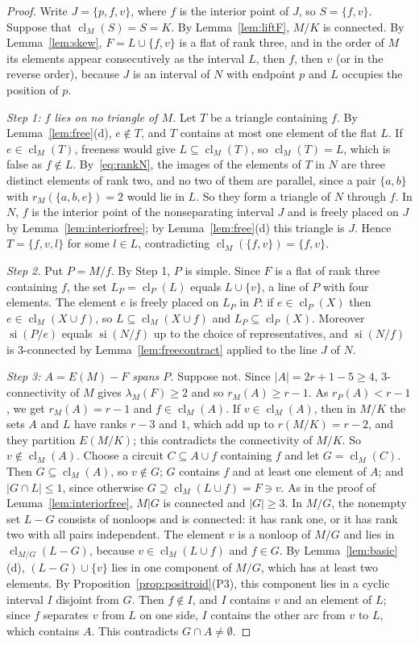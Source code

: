 \documentclass[11pt]{amsart}
\theoremstyle{definition}
\theoremstyle{remark}
\numberwithin{equation}{section}
\newcommand{\cl}{\operatorname{cl}}
\newcommand{\si}{\operatorname{si}}
\newcommand{\lam}{\lambda}
\begin{document}
\begin{proof}
Write $J=\{p,f,v\}$, where $f$ is the interior point of $J$, so $S=\{f,v\}$. Suppose that $\cl_M(S)=S=K$. By Lemma~\ref{lem:liftF}, $M/K$ is connected. By Lemma~\ref{lem:skew}, $F=L\cup\{f,v\}$ is a flat of rank three, and in the order of $M$ its elements appear consecutively as the interval $L$, then $f$, then $v$ (or in the reverse order), because $J$ is an interval of $N$ with endpoint $p$ and $L$ occupies the position of $p$.

\emph{Step 1: $f$ lies on no triangle of $M$.} Let $T$ be a triangle containing $f$. By Lemma~\ref{lem:free}(d), $e\notin T$, and $T$ contains at most one element of the flat $L$. If $e\in\cl_M(T)$, freeness would give $L\subseteq\cl_M(T)$, so $\cl_M(T)=L$, which is false as $f\notin L$. By~\eqref{eq:rankN}, the images of the elements of $T$ in $N$ are three distinct elements of rank two, and no two of them are parallel, since a pair $\{a,b\}$ with $r_M(\{a,b,e\})=2$ would lie in $L$. So they form a triangle of $N$ through $f$. In $N$, $f$ is the interior point of the nonseparating interval $J$ and is freely placed on $J$ by Lemma~\ref{lem:interiorfree}; by Lemma~\ref{lem:free}(d) this triangle is $J$. Hence $T=\{f,v,l\}$ for some $l\in L$, contradicting $\cl_M(\{f,v\})=\{f,v\}$.

\emph{Step 2.} Put $P=M/f$. By Step 1, $P$ is simple. Since $F$ is a flat of rank three containing $f$, the set $L_P=\cl_P(L)$ equals $L\cup\{v\}$, a line of $P$ with four elements. The element $e$ is freely placed on $L_P$ in $P$: if $e\in\cl_P(X)$ then $e\in\cl_M(X\cup f)$, so $L\subseteq\cl_M(X\cup f)$ and $L_P\subseteq\cl_P(X)$. Moreover $\si(P/e)$ equals $\si(N/f)$ up to the choice of representatives, and $\si(N/f)$ is $3$-connected by Lemma~\ref{lem:freecontract} applied to the line $J$ of $N$.

\emph{Step 3: $A=E(M)-F$ spans $P$.} Suppose not. Since $|A|=2r+1-5\ge4$, $3$-connectivity of $M$ gives $\lam_M(F)\ge2$ and so $r_M(A)\ge r-1$. As $r_P(A)<r-1$, we get $r_M(A)=r-1$ and $f\in\cl_M(A)$. If $v\in\cl_M(A)$, then in $M/K$ the sets $A$ and $L$ have ranks $r-3$ and $1$, which add up to $r(M/K)=r-2$, and they partition $E(M/K)$; this contradicts the connectivity of $M/K$. So $v\notin\cl_M(A)$. Choose a circuit $C\subseteq A\cup f$ containing $f$ and let $G=\cl_M(C)$. Then $G\subseteq\cl_M(A)$, so $v\notin G$; $G$ contains $f$ and at least one element of $A$; and $|G\cap L|\le1$, since otherwise $G\supseteq\cl_M(L\cup f)=F\ni v$. As in the proof of Lemma~\ref{lem:interiorfree}, $M|G$ is connected and $|G|\ge3$. In $M/G$, the nonempty set $L-G$ consists of nonloops and is connected: it has rank one, or it has rank two with all pairs independent. The element $v$ is a nonloop of $M/G$ and lies in $\cl_{M/G}(L-G)$, because $v\in\cl_M(L\cup f)$ and $f\in G$. By Lemma~\ref{lem:basic}(d), $(L-G)\cup\{v\}$ lies in one component of $M/G$, which has at least two elements. By Proposition~\ref{prop:positroid}(P3), this component lies in a cyclic interval $I$ disjoint from $G$. Then $f\notin I$, and $I$ contains $v$ and an element of $L$; since $f$ separates $v$ from $L$ on one side, $I$ contains the other arc from $v$ to $L$, which contains $A$. This contradicts $G\cap A\ne\emptyset$.


\end{proof}
\end{document}
